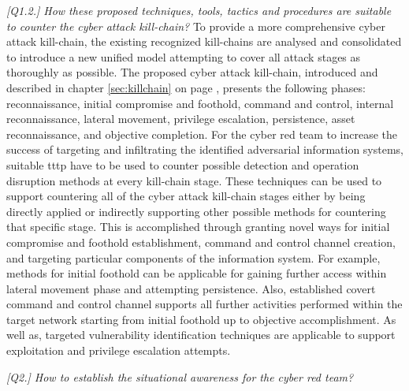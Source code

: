 \textit{[Q1.2.] How these proposed techniques, tools, tactics and procedures are suitable to counter the cyber attack kill-chain?}
To provide a more comprehensive cyber attack kill-chain, the existing recognized kill-chains are analysed and consolidated to introduce a new unified model attempting to cover all attack stages as thoroughly as possible. The proposed cyber attack kill-chain, introduced and described in chapter \ref{sec:killchain} on page \pageref{sec:killchain}, presents the following phases: reconnaissance, initial compromise and foothold, command and control, internal reconnaissance, lateral movement, privilege escalation, persistence, asset reconnaissance, and objective completion. For the cyber red team to increase the success of targeting and infiltrating the identified adversarial information systems, suitable \gls{tttp} have to be used to counter possible detection and operation disruption methods at every kill-chain stage. These techniques can be used to support countering all of the cyber attack kill-chain stages either by being directly applied or indirectly supporting other possible methods for countering that specific stage. This is accomplished through granting novel ways for initial compromise and foothold establishment, command and control channel creation, and targeting particular components of the information system. For example, methods for initial foothold can be applicable for gaining further access within lateral movement phase and attempting persistence. Also, established covert command and control channel supports all further activities performed within the target network starting from initial foothold up to objective accomplishment. As well as, targeted vulnerability identification techniques are applicable to support exploitation and privilege escalation attempts.

\textit{[Q2.] How to establish the situational awareness for the cyber red team?}

